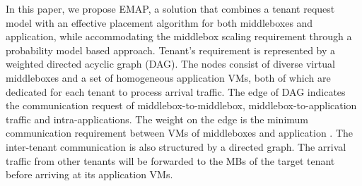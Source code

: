 \documentclass[review]{elsarticle}
\begin{document}
In this paper, we propose EMAP, a solution that combines a tenant request model with an effective placement algorithm for both middleboxes and application, while accommodating the middlebox scaling requirement through a probability model based approach.  
Tenant's requirement is represented by a weighted directed acyclic graph (DAG). The nodes consist of diverse virtual middleboxes and a set of homogeneous application VMs, both of which are dedicated for each tenant to process arrival traffic. The edge of DAG indicates the communication request of middlebox-to-middlebox, middlebox-to-application traffic and intra-applications. The weight on the edge is the minimum communication requirement between VMs of middleboxes and application \cite{stratos12, B11tpd}. The inter-tenant communication \cite{B13cta} is also structured by a directed graph. The arrival traffic from other tenants will be forwarded to the MBs of the target tenant before arriving at its application VMs.
\end{document}
